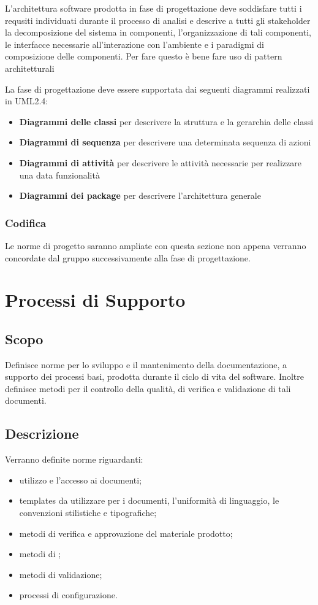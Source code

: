 \documentclass[12pt,a4paper]{article}
\begin{document}
L'architettura software prodotta in fase di progettazione deve soddisfare tutti i requsiti individuati durante il processo di analisi e descrive a tutti gli stakeholder la decomposizione del sistema in componenti, l'organizzazione di tali componenti, le interfacce necessarie all'interazione con l'ambiente e i paradigmi di composizione delle componenti. Per fare questo è bene fare uso di pattern architetturali

La fase di progettazione deve essere supportata dai seguenti diagrammi realizzati in UML2.4:
\begin{itemize}
\item \textbf{Diagrammi delle classi} per descrivere la struttura e la gerarchia delle classi
\item \textbf{Diagrammi di sequenza} per descrivere una determinata sequenza di azioni
\item \textbf{Diagrammi di attività} per descrivere le attività necessarie per realizzare una data funzionalità
\item \textbf{Diagrammi dei package} per descrivere l'architettura generale
\end{itemize}

\subsubsection{Codifica}
Le norme di progetto saranno ampliate con questa sezione non appena verranno concordate dal gruppo successivamente alla fase di progettazione.

\newpage

\section{Processi di Supporto} %

\subsection{Scopo}
Definisce norme per lo sviluppo e il mantenimento della documentazione, a supporto dei processi basi, prodotta durante il ciclo di vita del software. Inoltre definisce metodi per il controllo della qualità, di verifica e validazione di tali documenti.

\subsection{Descrizione}
Verranno definite norme riguardanti:
\begin{itemize}
  \item utilizzo e l'accesso ai documenti;
  \item templates da utilizzare per i documenti, l'uniformità di linguaggio, le convenzioni stilistiche e tipografiche;
  \item metodi di verifica e approvazione del materiale prodotto;
  \item metodi di \textit{};
  \item metodi di validazione;
  \item processi di configurazione.
\end{itemize}
\end{document}
